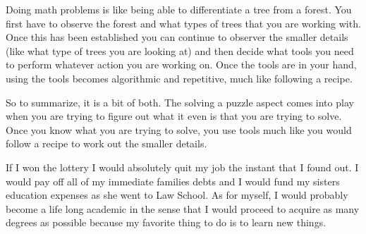  {
    \begin{Highlight}
        Doing math problems is like being able to differentiate a tree from a forest. You first have to observe the forest and what types of trees that you are working with. Once this has been established
        you can continue to observer the smaller details (like what type of trees you are looking at) and then decide what tools you need to perform whatever action you are working on. Once the tools are
        in your hand, using the tools becomes algorithmic and repetitive, much like following a recipe.

        So to summarize, it is a bit of both. The solving a puzzle aspect comes into play when you are trying to figure out what it even is that you are trying to solve. Once you know what you are trying to
        solve, you use tools much like you would follow a recipe to work out the smaller details.
    \end{Highlight}
}

 {
    \begin{Highlight}
        If I won the lottery I would absolutely quit my job the instant that I found out. I would pay off all of my immediate families debts and I would fund my sisters education expenses as she went to Law
        School. As for myself, I would probably become a life long academic in the sense that I would proceed to acquire as many degrees as possible because my favorite thing to do is to learn new things.
    \end{Highlight}
}